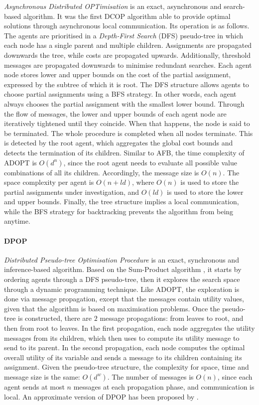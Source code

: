 \emph{Asynchronous Distributed OPTimisation} \cite{modi2005adopt,junges2008} is an exact,
asynchronous and search-based algorithm. It was the first DCOP algorithm able to provide
optimal solutions through asynchronous local communication. Its operation is as follows.
The agents are prioritised in a \emph{Depth-First Search} (DFS) \cite{cormen2009}
pseudo-tree in which each node has a single parent and multiple children. Assignments are
propagated downwards the tree, while costs are propagated upwards. Additionally, threshold
messages are propagated downwards to minimise redundant searches. Each agent node stores
lower and upper bounds on the cost of the partial assignment, expressed by the subtree of
which it is root. The DFS structure allows agents to choose partial assignments using a
BFS strategy. In other words, each agent always chooses the partial assignment with the
smallest lower bound. Through the flow of messages, the lower and upper bounds of each
agent node are iteratively tightened until they coincide. When that happens, the node is
said to be terminated. The whole procedure is completed when all nodes terminate. This is
detected by the root agent, which aggregates the global cost bounds and detects the
termination of its children.
Similar to AFB, the time complexity of ADOPT is $O(d^n)$, since the root agent needs to
evaluate all possible value combinations of all its children. Accordingly, the message
size is $O(n)$. The space complexity per agent is $O(n + ld)$, where $O(n)$ is used to
store the partial assignments under investigation, and $O(ld)$ is used to store the lower
and upper bounds. Finally, the tree structure implies a local communication, while the BFS
strategy for backtracking prevents the algorithm from being anytime.

\paragraph{DPOP}

\emph{Distributed Pseudo-tree Optimisation Procedure} \cite{petcu2005,junges2008} is an
exact, synchronous and inference-based algorithm. Based on the Sum-Product algorithm
\cite{kschischang2001}, it starts by ordering agents through a DFS pseudo-tree, then
it explores the search space through a dynamic programming technique. Like ADOPT, the
exploration is done via message propagation, except that the messages contain utility
values, given that the algorithm is based on maximisation problems. Once the
pseudo-tree is constructed, there are $2$ message propagations: from leaves to root, and
then from root to leaves. In the first propagation, each node aggregates the utility
messages from its children, which then uses to compute its utility message to send to its
parent. In the second propagation, each node computes the optimal overall utility of its
variable and sends a message to its children containing its assignment.
Given the pseudo-tree structure, the complexity for space, time and message size is the
same: $O(d^w)$. The number of messages is $O(n)$, since each agent sends at most $n$
messages at each propagation phase, and communication is local. An approximate version of
DPOP has been proposed by \cite{petcu2005b}.

